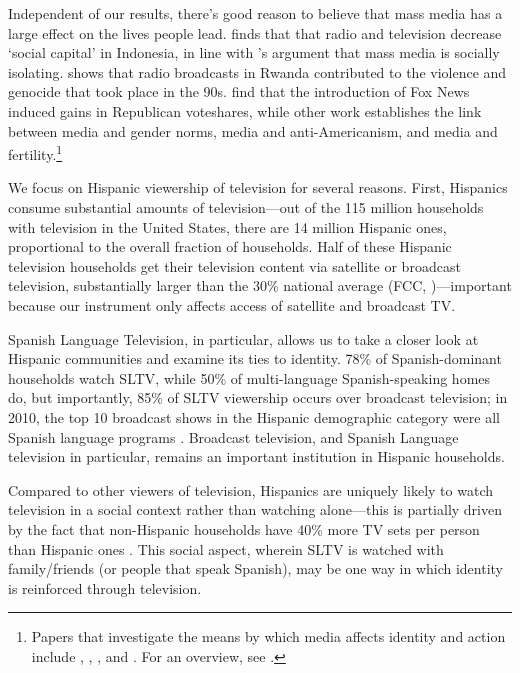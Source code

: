 \documentclass[11pt]{article}
\begin{document}
Independent of our results, there's good reason to believe that mass media has a large effect on the lives people lead. \cite{olken_television_2009} finds that that radio and television decrease `social capital' in Indonesia, in line with \cite{putnam_bowling_2001}'s argument that mass media is socially isolating. \cite{yanagizawa-drott_propaganda_2014} shows that radio broadcasts in Rwanda contributed to the violence and genocide that took place in the 90s. \cite{dellavigna_fox_2007} find that the introduction of Fox News induced gains in Republican voteshares, while other work establishes the link between media and gender norms, media and anti-Americanism, and media and fertility.\footnote{ Papers that investigate the means by which media affects identity and action include \cite{jensen_power_2009}, \cite{gentzkow_media_2004}, \cite{ferrara_soap_2012}, and \cite{kearney_media_2015}. For an overview, see \cite{dellavigna_economic_2015}.}

We focus on Hispanic viewership of television for several reasons. First, Hispanics consume substantial amounts of television---out of the 115 million households with television in the United States, there are 14 million Hispanic ones, proportional to the overall fraction of households. Half of these Hispanic television households get their television content via satellite or broadcast television, substantially larger than the 30\% national average (FCC\cite{noauthor_hispanic_2016}, \cite{de_la_merced_att_2014})---important because our instrument only affects access of satellite and broadcast TV.

Spanish Language Television, in particular, allows us to take a closer look at Hispanic communities and examine its ties to identity. 78\% of Spanish-dominant households watch SLTV, while 50\% of multi-language Spanish-speaking homes do, but importantly, 85\% of SLTV viewership occurs over broadcast television; in 2010, the top 10 broadcast shows in the Hispanic demographic category were all Spanish language programs \citep{pardo_three_2011}. Broadcast television, and Spanish Language television in particular, remains an important institution in Hispanic households. 
 
 Compared to other viewers of television, Hispanics are uniquely likely to watch television in a social context rather than watching alone---this is partially driven by the fact that non-Hispanic households have 40\% more TV sets per person than Hispanic ones \citep{coghill_tuning_2018}. This social aspect, wherein SLTV is watched with family/friends (or people that speak Spanish), may be one way in which identity is reinforced through television. 
\end{document}
